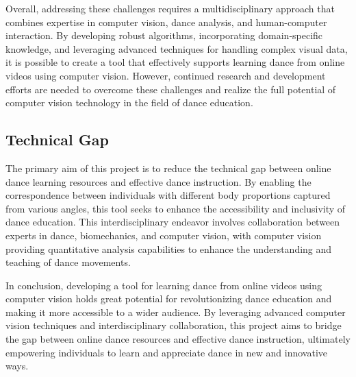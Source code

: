 Overall, addressing these challenges requires a multidisciplinary approach that combines expertise 
in computer vision, dance analysis, and human-computer interaction. By developing robust algorithms, 
incorporating domain-specific knowledge, and leveraging advanced techniques for handling complex 
visual data, it is possible to create a tool that effectively supports learning dance from online 
videos using computer vision. However, continued research and development efforts are needed to 
overcome these challenges and realize the full potential of computer vision technology in the 
field of dance education.

\subsection{Technical Gap}
The primary aim of this project is to reduce the technical gap between online dance learning resources and 
effective dance instruction. By enabling the correspondence between individuals with different body proportions 
captured from various angles, this tool seeks to enhance the accessibility and inclusivity of dance education. 
This interdisciplinary endeavor involves collaboration between experts in dance, biomechanics, and computer 
vision, with computer vision providing quantitative analysis capabilities to enhance the understanding and 
teaching of dance movements.

In conclusion, developing a tool for learning dance from online videos using computer vision holds 
great potential for revolutionizing dance education and making it more accessible to a wider 
audience. By leveraging advanced computer vision techniques and interdisciplinary collaboration, 
this project aims to bridge the gap between online dance resources and effective dance instruction, 
ultimately empowering individuals to learn and appreciate dance in new and innovative ways.



